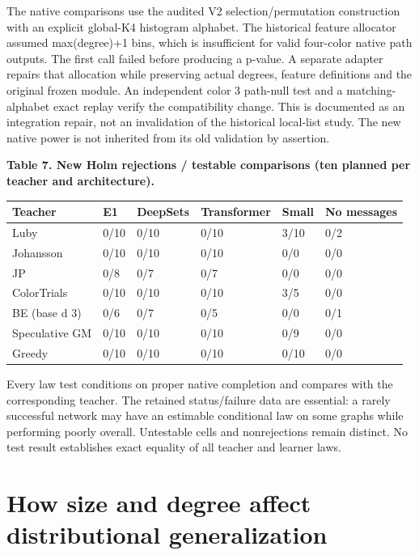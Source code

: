 \documentclass[
  11pt,
]{article}
\newcounter{none} %
\begin{document}
The native comparisons use the audited V2 selection/permutation
construction with an explicit global-K4 histogram alphabet. The
historical feature allocator assumed max(degree)+1 bins, which is
insufficient for valid four-color native path outputs. The first call
failed before producing a p-value. A separate adapter repairs that
allocation while preserving actual degrees, feature definitions and the
original frozen module. An independent color 3 path-null test and a
matching-alphabet exact replay verify the compatibility change. This is
documented as an integration repair, not an invalidation of the
historical local-list study. The new native power is not inherited from
its old validation by assertion.

\textbf{Table 7. New Holm rejections / testable comparisons (ten planned
per teacher and architecture).}

{\def\LTcaptype{none} %
\begin{longtable}[]{@{}llllll@{}}
\toprule\noalign{}
Teacher & E1 & DeepSets & Transformer & Small & No messages \\
\midrule\noalign{}
\endhead
\bottomrule\noalign{}
\endlastfoot
Luby & 0/10 & 0/10 & 0/10 & 3/10 & 0/2 \\
Johansson & 0/10 & 0/10 & 0/10 & 0/0 & 0/0 \\
JP & 0/8 & 0/7 & 0/7 & 0/0 & 0/0 \\
ColorTrials & 0/10 & 0/10 & 0/10 & 3/5 & 0/0 \\
BE (base d 3) & 0/6 & 0/7 & 0/5 & 0/0 & 0/1 \\
Speculative GM & 0/10 & 0/10 & 0/10 & 0/9 & 0/0 \\
Greedy & 0/10 & 0/10 & 0/10 & 0/10 & 0/0 \\
\end{longtable}
}

Every law test conditions on proper native completion and compares with
the corresponding teacher. The retained status/failure data are
essential: a rarely successful network may have an estimable conditional
law on some graphs while performing poorly overall. Untestable cells and
nonrejections remain distinct. No test result establishes exact equality
of all teacher and learner laws.

\section{How size and degree affect distributional
generalization}\label{how-size-and-degree-affect-distributional-generalization}
\end{document}
